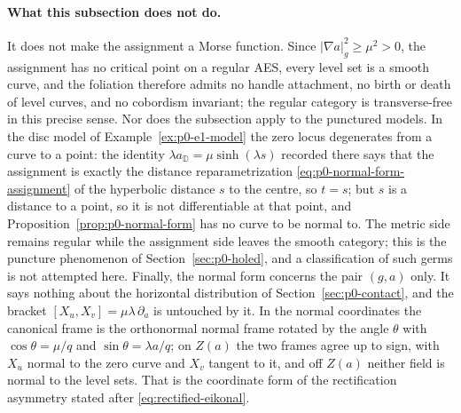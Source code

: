 \paragraph{What this subsection does not do.}
It does not make the assignment a Morse function.  Since
$|\nabla a|_g^2\ge\mu^2>0$, the assignment has no critical point on a regular
AES, every level set is a smooth curve, and the foliation therefore admits no
handle attachment, no birth or death of level curves, and no cobordism
invariant; the regular category is transverse-free in this precise sense.  Nor
does the subsection apply to the punctured models.  In the disc model of
Example~\ref{ex:p0-e1-model} the zero locus degenerates from a curve to a point:
the identity $\lambda a_{\mathbb D}=\mu\sinh(\lambda s)$ recorded there says
that the assignment is exactly the distance reparametrization
\eqref{eq:p0-normal-form-assignment} of the hyperbolic distance $s$ to the
centre, so $t=s$; but $s$ is a distance to a point, so it is not differentiable
at that point, and Proposition~\ref{prop:p0-normal-form} has no curve to be
normal to.  The metric side remains regular while the assignment side leaves the
smooth category; this is the puncture phenomenon of
Section~\ref{sec:p0-holed}, and a classification of such germs is not attempted
here.  Finally, the normal form
concerns the pair $(g,a)$ only.  It says nothing about the horizontal
distribution of Section~\ref{sec:p0-contact}, and the bracket
$[X_u,X_v]=\mu\lambda\,\partial_a$ is untouched by it.  In the normal coordinates
the canonical frame is the orthonormal normal frame rotated by the angle
$\theta$ with $\cos\theta=\mu/q$ and $\sin\theta=\lambda a/q$; on $Z(a)$ the two
frames agree up to sign, with $X_u$ normal to the zero curve and $X_v$ tangent
to it, and off $Z(a)$ neither field is normal to the level sets.  That is the coordinate
form of the rectification asymmetry stated after \eqref{eq:rectified-eikonal}.
